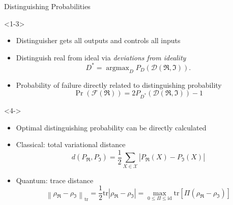 \documentclass[xcolor=dvipsnames]{beamer}
\newcommand{\?}{\mathrel{?}} %
\DeclareMathOperator*{\argmax}{argmax}
\newcommand{\norm}[1]{\left\lVert#1\right\rVert} %
\newcommand{\abs}[1]{\left\lvert#1\right\rvert} %
\newcommand{\tr}{\mathrm{tr}} %
\newcommand{\id}{\mathrm{id}} %
\newcommand{\frI}{\mathfrak{I}}
\newcommand{\frR}{\mathfrak{R}}
\newcommand{\Dist}{\mathcal{D}}
\newcommand{\DistRI}{\Dist(\frR, \frI)}
\newcommand{\Fail}{\mathcal{F}}
\newcommand{\sX}{\mathcal{X}}
\begin{document}
\begin{frame}{Distinguishing Probabilities}
  \begin{onlyenv}<1-3>
    \begin{itemize}[<+->]
      \item Distinguisher gets all outputs and controls all inputs
      \item Distinguish real from ideal via \emph{deviations from ideality}
        \[ D^* = \argmax_D P_D(\DistRI). \]
      \item Probability of failure directly related to distinguishing probability
        \[ \Pr(\Fail(\frR)) = 2P_{D^*}(\DistRI) - 1 \]
    \end{itemize}
  \end{onlyenv}
  \begin{onlyenv}<4->
    \begin{itemize}[<+->]
      \item Optimal distinguishing probability can be directly calculated
      \item Classical: total variational distance
        \[ d(P_{\frR}, P_{\frI}) = \frac{1}{2} \sum_{X \in \sX} \abs{P_{\frR}(X) - P_{\frI}(X)} \]
      \item Quantum: trace distance
        \[ \norm{\rho_{\frR} - \rho_{\frI}}_{\tr} = \frac{1}{2} \tr \abs{\rho_{\frR} - \rho_{\frI}} = \max_{0 \leq \Pi \leq \id} \tr\left[ \Pi(\rho_{\frR} - \rho_{\frI}) \right] \]
    \end{itemize}
  \end{onlyenv}
\end{frame}
\end{document}
